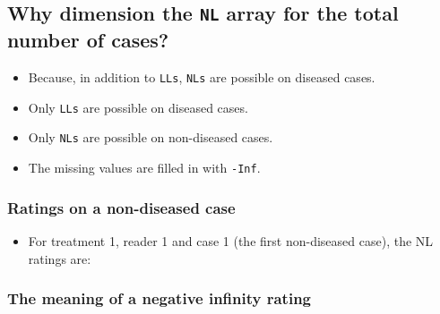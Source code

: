 \documentclass[]{book}
\newenvironment{Shaded}{\begin{snugshade}}{\end{snugshade}}
\newcommand{\CommentTok}[1]{\textcolor[rgb]{0.56,0.35,0.01}{\textit{#1}}}
\newcommand{\DecValTok}[1]{\textcolor[rgb]{0.00,0.00,0.81}{#1}}
\newcommand{\NormalTok}[1]{#1}
\newcommand{\OperatorTok}[1]{\textcolor[rgb]{0.81,0.36,0.00}{\textbf{#1}}}
\providecommand{\tightlist}{%
  \setlength{\itemsep}{0pt}\setlength{\parskip}{0pt}}
\begin{document}
\hypertarget{why-dimension-the-nl-array-for-the-total-number-of-cases-1}{%
\subsection{\texorpdfstring{Why dimension the \texttt{NL} array for the total number of cases?}{Why dimension the NL array for the total number of cases?}}\label{why-dimension-the-nl-array-for-the-total-number-of-cases-1}}

\begin{itemize}
\tightlist
\item
  Because, in addition to \texttt{LLs}, \texttt{NLs} are possible on diseased cases.
\item
  Only \texttt{LLs} are possible on diseased cases.
\item
  Only \texttt{NLs} are possible on non-diseased cases.
\item
  The missing values are filled in with \texttt{-Inf}.
\end{itemize}

\hypertarget{ratings-on-a-non-diseased-case-1}{%
\subsubsection{Ratings on a non-diseased case}\label{ratings-on-a-non-diseased-case-1}}

\begin{itemize}
\tightlist
\item
  For treatment 1, reader 1 and case 1 (the first non-diseased case), the NL ratings are:
\end{itemize}

\begin{Shaded}
\end{Shaded}

\hypertarget{the-meaning-of-a-negative-infinity-rating}{%
\subsubsection{The meaning of a negative infinity rating}\label{the-meaning-of-a-negative-infinity-rating}}
\end{document}
